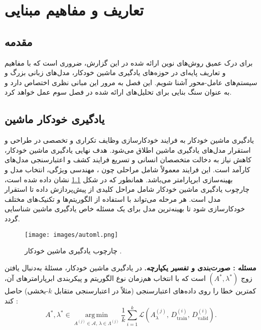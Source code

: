 
\chapter{تعاریف و مفاهیم مبنایی }
\thispagestyle{empty}
\section{مقدمه}
برای درک عمیق روش‌های نوین ارائه شده در این گزارش، ضروری است که با مفاهیم و تعاریف پایه‌ای در حوزه‌های یادگیری ماشین خودکار، مدل‌های زبانی بزرگ و سیستم‌های عامل-محور آشنا شویم. این فصل به مرور این مبانی نظری اختصاص دارد و به عنوان سنگ بنایی برای تحلیل‌های ارائه شده در فصل سوم عمل خواهد کرد.
\section{یادگیری خودکار ماشین}
یادگیری ماشین خودکار به فرایند خودکارسازی وظایف تکراری و تخصصی در طراحی و استقرار مدل‌های یادگیری ماشین اطلاق می‌شود. هدف نهایی یادگیری ماشین خودکار، کاهش نیاز به دخالت متخصصان انسانی و تسریع فرایند کشف و اعتبارسنجی مدل‌های کارآمد است. این فرایند معمولاً شامل مراحلی چون ، مهندسی ویژگی، انتخاب مدل و بهینه‌سازی ابرپارامتر می‌باشد. همانطور که در شکل \ref{fig:automl} نشان داده شده است، چارچوب یادگیری ماشین خودکار شامل مراحل کلیدی از پیش‌پردازش داده تا استقرار مدل است. هر مرحله می‌تواند با استفاده از الگوریتم‌ها و تکنیک‌های مختلف خودکارسازی شود تا بهینه‌ترین مدل برای یک مسئله خاص یادگیری ماشین شناسایی گردد.
\begin{figure}[h!]
    \centering
    \texttt{[image: images/automl.png]}
    \caption[چارچوب یادگیری ماشین خودکار]{
        چارچوب یادگیری ماشین خودکار
         \cite{salehin2024automl}.
    }
    \label{fig:automl}
\end{figure}
\noindent\textbf{مسئله : صورت‌بندی و تفسیر یکپارچه.}
در یادگیری ماشین خودکار، مسئلهٔ  به‌دنبال یافتن زوج \((A^{*}, \lambda^{*})\) است که با انتخاب هم‌زمان نوع الگوریتم و پیکربندی ابرپارامترهای آن، کمترین خطا را روی داده‌های اعتبارسنجی (مثلاً در اعتبارسنجی متقابل \(k\)-بخشی) حاصل کند \cite{thornton2013autoweka}:
\begin{equation}
\label{eq:cash}
A^{*}, \lambda^{*} \in
\operatorname*{arg\,min}_{A^{(j)} \in \mathcal{A},\, \lambda \in \Lambda^{(j)}}
\frac{1}{k}\sum_{i=1}^{k}
\mathcal{L}\!\left(A^{(j)}_{\lambda},\, D^{(i)}_{\mathrm{train}},\, D^{(i)}_{\mathrm{valid}}\right).
\end{equation}
